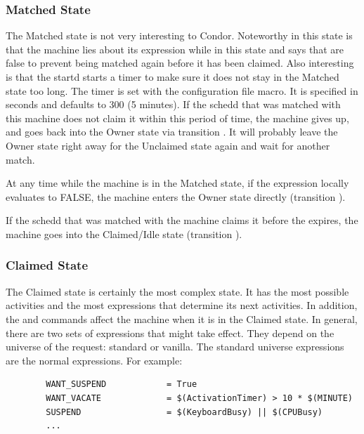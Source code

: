 \subsubsection{\label{sec:Matched-State}Matched State}

The Matched state is not very interesting to Condor.
Noteworthy in this state is that the machine lies about its 
expression while in this state and says that  are
false to prevent being matched again before it has been claimed.
Also interesting is that
the startd starts a timer to make sure it does not stay in the
Matched state too long.
The timer is set with the 
\label{param:MatchTimeout} configuration file macro.
It is specified in seconds and defaults to 300 (5 minutes).
If the schedd that was matched with this machine does not
claim it within this period of time, the machine gives up,
and goes back into the Owner state via transition .
It will probably leave the Owner state right away for the
Unclaimed state again and wait for another match. 

At any time while the machine is in the Matched state, if the
 expression locally evaluates to FALSE, the machine enters
the Owner state directly (transition ).

If the schedd that was matched with the machine claims it before the
 expires, the machine goes into the Claimed/Idle
state (transition ).

\subsubsection{\label{sec:Claimed-State}Claimed State}

The Claimed state is certainly the most complex state.
It has the most possible activities and the most expressions that
determine its next activities.
In addition, the  and  commands affect
the machine when it is in the Claimed state.
In general, there are two sets of expressions that might take effect.
They depend on the universe of the request: standard or vanilla.
The standard universe expressions are the normal expressions.
For example:
\begin{verbatim}
        WANT_SUSPEND            = True
        WANT_VACATE             = $(ActivationTimer) > 10 * $(MINUTE)
        SUSPEND                 = $(KeyboardBusy) || $(CPUBusy)
        ...
\end{verbatim}

